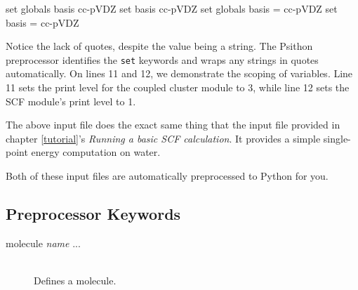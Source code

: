 \begin{Snippet}
set globals basis cc-pVDZ
set basis cc-pVDZ
set globals basis = cc-pVDZ
set basis = cc-pVDZ
\end{Snippet}

Notice the lack of quotes, despite
the value being a string.  The Psithon preprocessor identifies the {\tt set}
keywords and wraps any strings in quotes automatically.  On lines 11 and 12, we
demonstrate the scoping of variables.  Line 11 sets the print level for the
coupled cluster module to 3, while line 12 sets the SCF module's print level to
1.

The above input file does the exact same thing that the input file provided
in chapter \ref{tutorial}'s {\em Running a basic SCF calculation}. It provides
a simple single-point energy computation on water.

Both of these input files are automatically preprocessed to Python for you.

\subsection{Preprocessor Keywords}

\begin{description}
\item[molecule {\em name } { ... }]\mbox{}\\
Defines a molecule.

\end{description}
